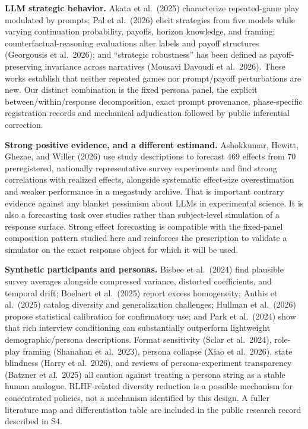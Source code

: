 \documentclass[11pt]{article}
\begin{document}
\textbf{LLM strategic behavior.} Akata et al.~(2025) characterize
repeated-game play modulated by prompts; Pal et al.~(2026) elicit
strategies from five models while varying continuation probability,
payoffs, horizon knowledge, and framing; counterfactual-reasoning
evaluations alter labels and payoff structures (Georgousis et al.~2026);
and ``strategic robustness'' has been defined as payoff-preserving
invariance across narratives (Mousavi Davoudi et al.~2026). These works
establish that neither repeated games nor prompt/payoff perturbations
are new. Our distinct combination is the fixed persona panel, the
explicit between/within/response decomposition, exact prompt provenance,
phase-specific registration records and mechanical adjudication followed
by public inferential correction.

\textbf{Strong positive evidence, and a different estimand.} Ashokkumar,
Hewitt, Ghezae, and Willer (2026) use study descriptions to forecast 469
effects from 70 preregistered, nationally representative survey
experiments and find strong correlations with realized effects,
alongside systematic effect-size overestimation and weaker performance
in a megastudy archive. That is important contrary evidence against any
blanket pessimism about LLMs in experimental science. It is also a
forecasting task over studies rather than subject-level simulation of a
response surface. Strong effect forecasting is compatible with the
fixed-panel composition pattern studied here and reinforces the
prescription to validate a simulator on the exact response object for
which it will be used.

\textbf{Synthetic participants and personas.} Bisbee et al.~(2024) find
plausible survey averages alongside compressed variance, distorted
coefficients, and temporal drift; Boelaert et al.~(2025) report excess
homogeneity; Anthis et al.~(2025) catalog diversity and generalization
challenges; Hullman et al.~(2026) propose statistical calibration for
confirmatory use; and Park et al.~(2024) show that rich interview
conditioning can substantially outperform lightweight
demographic/persona descriptions. Format sensitivity (Sclar et
al.~2024), role-play framing (Shanahan et al.~2023), persona collapse
(Xiao et al.~2026), state blindness (Harry et al.~2026), and reviews of
persona-experiment transparency (Batzner et al.~2025) all caution
against treating a persona string as a stable human analogue.
RLHF-related diversity reduction is a possible mechanism for
concentrated policies, not a mechanism identified by this design. A
fuller literature map and differentiation table are included in the
public research record described in S4.
\end{document}
